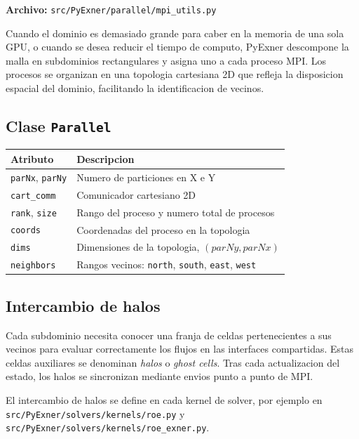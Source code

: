 \documentclass[11pt,a4paper]{article}
\newcommand{\code}[1]{\texttt{#1}}
\begin{document}
\textbf{Archivo:} \code{src/PyExner/parallel/mpi\_utils.py}

Cuando el dominio es demasiado grande para caber en la memoria de una sola GPU, o cuando se
desea reducir el tiempo de computo, PyExner descompone la malla en subdominios rectangulares y
asigna uno a cada proceso MPI. Los procesos se organizan en una topologia cartesiana 2D que
refleja la disposicion espacial del dominio, facilitando la identificacion de vecinos.

\subsection{Clase \code{Parallel}}

\begin{tabularx}{\textwidth}{L{3.5cm}Y}
\toprule
Atributo & Descripcion \\
\midrule
\code{parNx}, \code{parNy} & Numero de particiones en X e Y \\
\code{cart\_comm} & Comunicador cartesiano 2D \\
\code{rank}, \code{size} & Rango del proceso y numero total de procesos \\
\code{coords} & Coordenadas del proceso en la topologia \\
\code{dims} & Dimensiones de la topologia, $(parNy, parNx)$ \\
\code{neighbors} & Rangos vecinos: \code{north}, \code{south}, \code{east}, \code{west} \\
\bottomrule
\end{tabularx}

\subsection{Intercambio de halos}

Cada subdominio necesita conocer una franja de celdas pertenecientes a sus vecinos para evaluar
correctamente los flujos en las interfaces compartidas. Estas celdas auxiliares se denominan
\emph{halos} o \emph{ghost cells}. Tras cada actualizacion del estado, los halos se sincronizan
mediante envios punto a punto de MPI.

El intercambio de halos se define en cada kernel de solver, por ejemplo en
\code{src/PyExner/solvers/\allowbreak kernels/roe.py} y
\code{src/PyExner/solvers/\allowbreak kernels/roe\_exner.py}.
\end{document}
